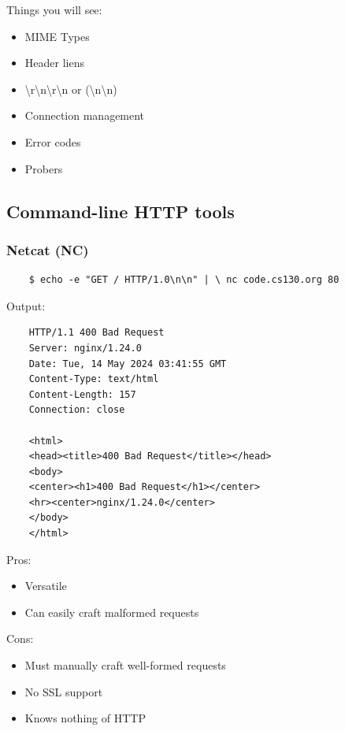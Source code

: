 \documentclass{article}
\begin{document}
Things you will see:
\begin{itemize}
    \item MIME Types
    \item Header liens
    \item \textbackslash r\textbackslash n\textbackslash r\textbackslash n or (\textbackslash n\textbackslash n)
    \item Connection management
    \item Error codes 
    \item Probers 
\end{itemize}

\subsection{Command-line HTTP tools}

\subsubsection{Netcat (NC)}

\begin{verbatim}
    $ echo -e "GET / HTTP/1.0\n\n" | \ nc code.cs130.org 80
\end{verbatim}

Output:

\begin{verbatim}
    HTTP/1.1 400 Bad Request
    Server: nginx/1.24.0
    Date: Tue, 14 May 2024 03:41:55 GMT
    Content-Type: text/html
    Content-Length: 157
    Connection: close

    <html>
    <head><title>400 Bad Request</title></head>
    <body>
    <center><h1>400 Bad Request</h1></center>
    <hr><center>nginx/1.24.0</center>
    </body>
    </html>
\end{verbatim}

Pros:
\begin{itemize}
    \item Versatile
    \item Can easily craft malformed requests
\end{itemize}

Cons:
\begin{itemize}
    \item Must manually craft well-formed requests
    \item No SSL support
    \item Knows nothing of HTTP 
\end{itemize}
\end{document}
